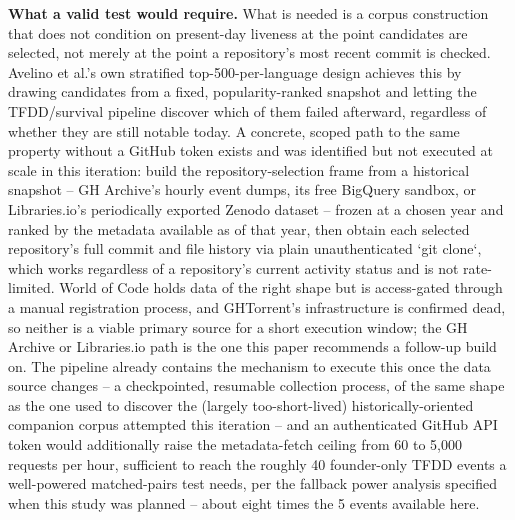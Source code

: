 \documentclass[11pt,letterpaper]{article}
\begin{document}
\textbf{What a valid test would require.} What is needed is a corpus construction that does not condition on present-day liveness at the point candidates are selected, not merely at the point a repository's most recent commit is checked. Avelino et al.'s own stratified top-500-per-language design achieves this by drawing candidates from a fixed, popularity-ranked snapshot and letting the TFDD/survival pipeline discover which of them failed afterward, regardless of whether they are still notable today. A concrete, scoped path to the same property without a GitHub token exists and was identified but not executed at scale in this iteration: build the repository-selection frame from a historical snapshot -- GH Archive's hourly event dumps, its free BigQuery sandbox, or Libraries.io's periodically exported Zenodo dataset -- frozen at a chosen year and ranked by the metadata available as of that year, then obtain each selected repository's full commit and file history via plain unauthenticated `git clone`, which works regardless of a repository's current activity status and is not rate-limited. World of Code holds data of the right shape but is access-gated through a manual registration process, and GHTorrent's infrastructure is confirmed dead, so neither is a viable primary source for a short execution window; the GH Archive or Libraries.io path is the one this paper recommends a follow-up build on. The pipeline already contains the mechanism to execute this once the data source changes -- a checkpointed, resumable collection process, of the same shape as the one used to discover the (largely too-short-lived) historically-oriented companion corpus attempted this iteration -- and an authenticated GitHub API token would additionally raise the metadata-fetch ceiling from 60 to 5,000 requests per hour, sufficient to reach the roughly 40 founder-only TFDD events a well-powered matched-pairs test needs, per the fallback power analysis specified when this study was planned -- about eight times the 5 events available here.
\end{document}
